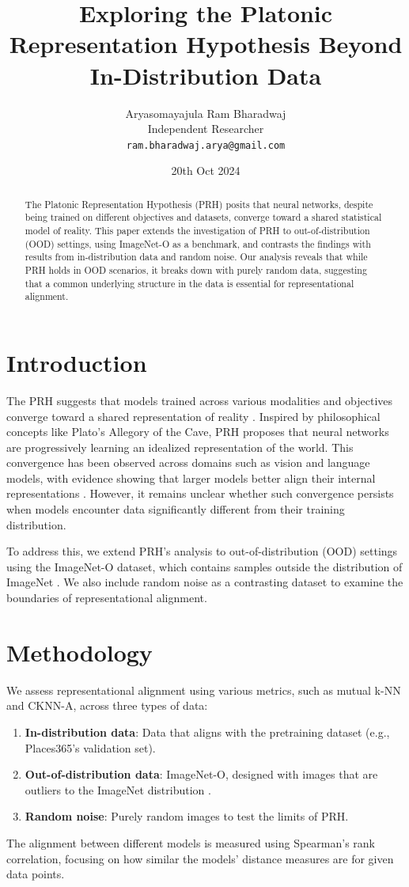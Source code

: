 \documentclass[10pt,a4paper]{article}
\title{Exploring the Platonic Representation Hypothesis Beyond In-Distribution Data}
\author{Aryasomayajula Ram Bharadwaj\\
Independent Researcher\\
\texttt{ram.bharadwaj.arya@gmail.com}}
\date{20th Oct 2024}
\begin{document}
\maketitle

\begin{abstract}
The Platonic Representation Hypothesis (PRH) \cite{huh2024prh} posits that neural networks, despite being trained on different objectives and datasets, converge toward a shared statistical model of reality. This paper extends the investigation of PRH to out-of-distribution (OOD) settings, using ImageNet-O as a benchmark, and contrasts the findings with results from in-distribution data and random noise. Our analysis reveals that while PRH holds in OOD scenarios, it breaks down with purely random data, suggesting that a common underlying structure in the data is essential for representational alignment.
\end{abstract}

\section{Introduction}
The PRH suggests that models trained across various modalities and objectives converge toward a shared representation of reality \cite{huh2024prh}. Inspired by philosophical concepts like Plato’s Allegory of the Cave, PRH proposes that neural networks are progressively learning an idealized representation of the world. This convergence has been observed across domains such as vision and language models, with evidence showing that larger models better align their internal representations \cite{huh2024prh}. However, it remains unclear whether such convergence persists when models encounter data significantly different from their training distribution.

To address this, we extend PRH's analysis to out-of-distribution (OOD) settings using the ImageNet-O dataset, which contains samples outside the distribution of ImageNet \cite{hendrycks2021nae}. We also include random noise as a contrasting dataset to examine the boundaries of representational alignment.

\section{Methodology}
We assess representational alignment using various metrics, such as mutual k-NN and CKNN-A, across three types of data:
\begin{enumerate}
    \item \textbf{In-distribution data}: Data that aligns with the pretraining dataset (e.g., Places365’s validation set).
    \item \textbf{Out-of-distribution data}: ImageNet-O, designed with images that are outliers to the ImageNet distribution \cite{hendrycks2021nae}.
    \item \textbf{Random noise}: Purely random images to test the limits of PRH.
\end{enumerate}
The alignment between different models is measured using Spearman's rank correlation, focusing on how similar the models' distance measures are for given data points.
\end{document}
